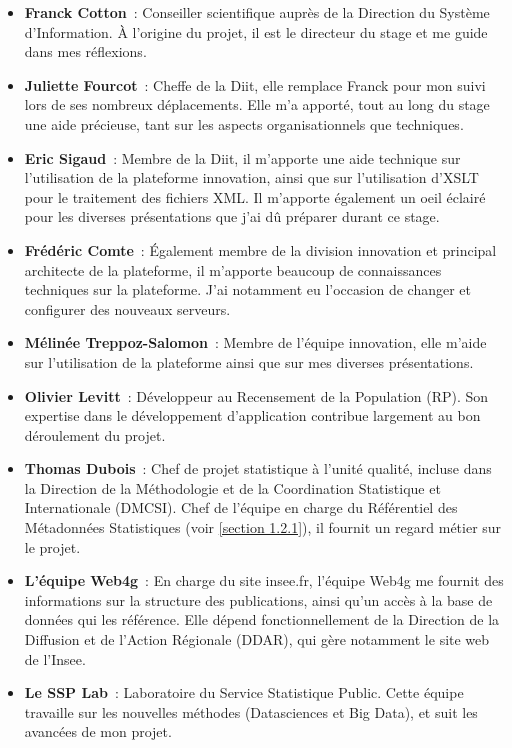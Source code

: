 \begin{itemize}
    \item \textbf{Franck Cotton}~: Conseiller scientifique auprès de la Direction du Système d'Information. À l'origine du projet, il est le directeur du stage et me guide dans mes réflexions.
    \vspace{5pt}
    \item \textbf{Juliette Fourcot}~: Cheffe de la Diit, elle remplace Franck pour mon suivi lors de ses nombreux déplacements. Elle m'a apporté, tout au long du stage une aide précieuse, tant sur les aspects organisationnels que techniques.
    \vspace{5pt}
    \item \textbf{Eric Sigaud}~: Membre de la Diit, il m'apporte une aide technique sur l'utilisation de la plateforme innovation, ainsi que sur l'utilisation d'XSLT pour le traitement des fichiers XML. Il m'apporte également un oeil éclairé pour les diverses présentations que j'ai dû préparer durant ce stage.
    \vspace{5pt}
    \item \textbf{Frédéric Comte}~: Également membre de la division innovation et principal architecte de la plateforme, il m'apporte beaucoup de connaissances techniques sur la plateforme. J'ai notamment eu l'occasion de changer et configurer des nouveaux serveurs.
    \vspace{5pt}
    \item \textbf{Mélinée Treppoz-Salomon}~: Membre de l'équipe innovation, elle m'aide sur l'utilisation de la plateforme ainsi que sur mes diverses présentations.
    \vspace{5pt}
    \item \textbf{Olivier Levitt}~: Développeur au Recensement de la Population (RP). Son expertise dans le développement d'application contribue largement au bon déroulement du projet.
    \vspace{5pt}
    \item \textbf{Thomas Dubois}~: Chef de projet statistique à l'unité qualité, incluse dans la Direction de la Méthodologie et de la Coordination Statistique et Internationale (DMCSI). Chef de l'équipe en charge du Référentiel des Métadonnées Statistiques (voir \ref{section 1.2.1}), il fournit un regard métier sur le projet.
    \vspace{5pt}
    \item \textbf{L'équipe Web4g}~: En charge du site insee.fr, l'équipe Web4g me fournit des informations sur la structure des publications, ainsi qu'un accès à la base de données qui les référence. Elle dépend fonctionnellement de la Direction de la Diffusion et de l'Action Régionale (DDAR), qui gère notamment le site web de l'Insee.
    \vspace{5pt}
    \item \textbf{Le SSP Lab}~: Laboratoire du Service Statistique Public. Cette équipe travaille sur les nouvelles méthodes (Datasciences et Big Data), et suit les avancées de mon projet.
    \newline
\end{itemize}

